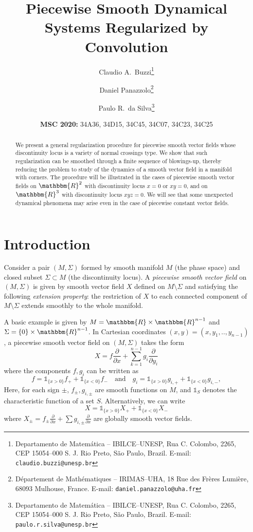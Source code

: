 \documentclass[11pt,psamsfonts]{article}
\title{Piecewise Smooth Dynamical Systems Regularized by Convolution}
\author{%
  Claudio A.~Buzzi\thanks{\scriptsize Departamento de Matem\'atica -- IBILCE--UNESP, 
  Rua C. Colombo, 2265, CEP 15054--000 S. J. Rio Preto, S\~ao Paulo, Brazil. 
  E-mail: \texttt{claudio.buzzi@unesp.br}}%
  \and
  Daniel Panazzolo\thanks{\scriptsize D\' epartement de Math\' ematiques -- IRIMAS--UHA,
  18 Rue des Fr\`eres Lumi\`ere, 68093 Mulhouse, France. 
  E-mail: \texttt{daniel.panazzolo@uha.fr}}%
  \and
  Paulo R.~da Silva\thanks{\scriptsize Departamento de Matem\'atica -- IBILCE--UNESP, 
  Rua C. Colombo, 2265, CEP 15054--000 S. J. Rio Preto, S\~ao Paulo, Brazil. 
  E-mail: \texttt{paulo.r.silva@unesp.br}}%
}
\date{\scriptsize \textbf{MSC 2020:} 34A36, 34D15, 34C45, 34C07, 34C23, 34C25}
\theoremstyle{definition}
\theoremstyle{remark}
\newcommand{\cR}{\ensuremath{\mathbbm{R}}}
\newcommand{\R}{\ensuremath{\cR}}
\begin{document}
\maketitle
\begin{abstract}
We present a general regularization procedure for piecewise smooth vector fields whose discontinuity locus is  a variety of normal crossings type. We show that such regularization can be smoothed through a finite sequence of blowings-up, thereby reducing the problem to study of the dynamics of a smooth vector field in a manifold with corners.  The procedure will be illustrated in the cases of piecewise smooth vector fields on $\cR^2$ with discontinuity locus $x=0$ or $xy=0$, and on $\cR^3$ with discontinuity locus $xyz=0$.  We will see that some unexpected dynamical phenomena may arise even in the case of piecewise constant vector fields.
\end{abstract}



\section{Introduction}\label{s0}
Consider a pair $(M,\Sigma)$ formed by smooth manifold $M$ (the phase space) and closed subset $\Sigma \subset M$ (the discontinuity locus). A {\em piecewise smooth vector field} on $(M,\Sigma)$ is given by smooth vector field $X$ defined on $M\setminus \Sigma$ and satisfying the following {\em extension property}:  the restriction of $X$ to each connected component of $M\setminus \Sigma$ extends smoothly to the whole manifold. 

A basic example is given by $M = \R\times\R^{n-1}$ and $\Sigma=\{0\}\times \cR^{n-1}$. In Cartesian coordinates $(x,y) = (x,y_1,..,y_{n-1})$, a piecewise smooth vector field on $(M,\Sigma)$ takes the form 
\begin{equation}
X=f \frac{\partial}{\partial x} + \sum_{k=1}^{n-1} g_i \frac{\partial}{\partial y_i}
\label{sisdesc}
\end{equation} 
where the components $f,g_i$ can be written as 
$$f = \mathds{1}_{\{x>0\}}f_+ + \mathds{1}_{\{x<0\}}f_-\quad\text{and}\quad
g_i = \mathds{1}_{\{x>0\}} g_{i,+} + \mathds{1}_{\{x<0\}} g_{i,-} ,
$$
Here, for each sign $\pm$,  $f_{\pm}, g_{i,\pm}$ are smooth functions on $M$, and $\mathds{1}_S$ denotes the characteristic function of a set $S$. Alternatively, we can write 
$$
X = \mathds{1}_{\{x>0\}} X_+ + \mathds{1}_{\{x<0\}} X_-
$$
where $X_\pm = f_\pm \frac{\partial}{\partial x} + \sum g_{i,\pm}\frac{\partial}{\partial x}$ are globally smooth vector fields.
\end{document}
